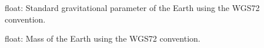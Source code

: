 \documentclass[letterpaper,10pt,english]{sphinxmanual}
\begin{document}
\begin{fulllineitems}
\label{\detokenize{modules/propagator_sgp4:propagator_sgp4.MU_earth}}
float: Standard gravitational parameter of the Earth using the WGS72 convention.

\end{fulllineitems}


\begin{fulllineitems}
\label{\detokenize{modules/propagator_sgp4:propagator_sgp4.M_earth}}
float: Mass of the Earth using the WGS72 convention.

\end{fulllineitems}

\end{document}
